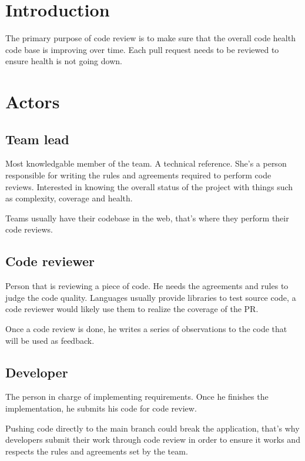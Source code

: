\section{Introduction}
The primary purpose of code review is to make sure that the overall code health code base is improving over time.
Each pull request needs to be reviewed to ensure health is not going down.


\section{Actors}
\subsection{Team lead}
Most knowledgable member of the team. A technical reference.
She's a person responsible for writing the rules and agreements required to perform code reviews. Interested in knowing the overall status of the project with things such as complexity, coverage and health.


Teams usually have their codebase in the web, that's where they perform their code reviews.

\subsection{Code reviewer}
Person that is reviewing a piece of code. He needs the agreements and rules to judge the code quality. Languages usually provide libraries to test source code, a code reviewer would likely use them to realize the coverage of the PR.

Once a code review is done, he writes a series of observations to the code that will be used as feedback.

\subsection{Developer}
The person in charge of implementing requirements. Once he finishes the implementation, he submits his code for code review.

Pushing code directly to the main branch could break the application, that's why developers submit their work through code review in order to ensure it works and respects the rules and agreements set by the team.

%
